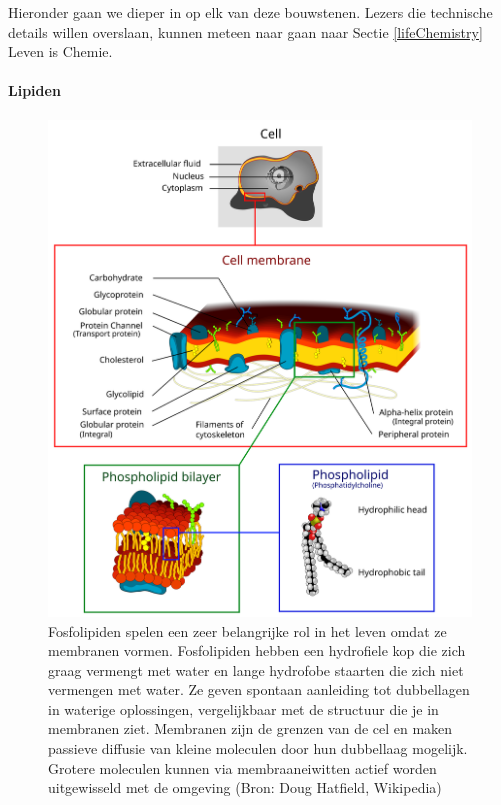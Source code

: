 \documentclass[
  11pt,
]{book}
\begin{document}
Hieronder gaan we dieper in op elk van deze bouwstenen. Lezers die technische details willen overslaan, kunnen meteen naar gaan naar Sectie \ref{lifeChemistry} Leven is Chemie.

\hypertarget{lipiden}{%
\paragraph{Lipiden}\label{lipiden}}

\begin{figure}

{\centering \includegraphics[width=0.8\linewidth]{./figs/Cell_membrane_detailed_diagram_4} 

}

\caption{Fosfolipiden spelen een zeer belangrijke rol in het leven omdat ze membranen vormen. Fosfolipiden hebben een hydrofiele kop die zich graag vermengt met water en lange hydrofobe staarten die zich niet vermengen met water. Ze geven spontaan aanleiding tot dubbellagen in waterige oplossingen, vergelijkbaar met de structuur die je in membranen ziet. Membranen zijn de grenzen van de cel en maken passieve diffusie van kleine moleculen door hun dubbellaag mogelijk. Grotere moleculen kunnen via membraaneiwitten actief worden uitgewisseld met de omgeving (Bron: Doug Hatfield, Wikipedia)}\label{fig:lipids}
\end{figure}
\end{document}
